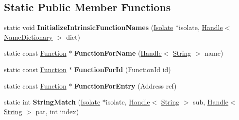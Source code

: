 \subsection*{Static Public Member Functions}
\begin{DoxyCompactItemize}
\item 
\hypertarget{classv8_1_1internal_1_1_runtime_a2af56c161b8cb654eaa8ef8f86e4ba5c}{}static void {\bfseries Initialize\+Intrinsic\+Function\+Names} (\hyperlink{classv8_1_1internal_1_1_isolate}{Isolate} $\ast$isolate, \hyperlink{classv8_1_1internal_1_1_handle}{Handle}$<$ \hyperlink{classv8_1_1internal_1_1_name_dictionary}{Name\+Dictionary} $>$ dict)\label{classv8_1_1internal_1_1_runtime_a2af56c161b8cb654eaa8ef8f86e4ba5c}

\item 
\hypertarget{classv8_1_1internal_1_1_runtime_aea6fd7c87dbfcbb2aa24d9b59214d557}{}static const \hyperlink{structv8_1_1internal_1_1_runtime_1_1_function}{Function} $\ast$ {\bfseries Function\+For\+Name} (\hyperlink{classv8_1_1internal_1_1_handle}{Handle}$<$ \hyperlink{classv8_1_1internal_1_1_string}{String} $>$ name)\label{classv8_1_1internal_1_1_runtime_aea6fd7c87dbfcbb2aa24d9b59214d557}

\item 
\hypertarget{classv8_1_1internal_1_1_runtime_a1fb4256645450f73e9ee39d4f38f3d58}{}static const \hyperlink{structv8_1_1internal_1_1_runtime_1_1_function}{Function} $\ast$ {\bfseries Function\+For\+Id} (Function\+Id id)\label{classv8_1_1internal_1_1_runtime_a1fb4256645450f73e9ee39d4f38f3d58}

\item 
\hypertarget{classv8_1_1internal_1_1_runtime_a82e21040bb88fd62e811b273d9592b62}{}static const \hyperlink{structv8_1_1internal_1_1_runtime_1_1_function}{Function} $\ast$ {\bfseries Function\+For\+Entry} (Address ref)\label{classv8_1_1internal_1_1_runtime_a82e21040bb88fd62e811b273d9592b62}

\item 
\hypertarget{classv8_1_1internal_1_1_runtime_a109f46396ee7cf24fa460908bff347a4}{}static int {\bfseries String\+Match} (\hyperlink{classv8_1_1internal_1_1_isolate}{Isolate} $\ast$isolate, \hyperlink{classv8_1_1internal_1_1_handle}{Handle}$<$ \hyperlink{classv8_1_1internal_1_1_string}{String} $>$ sub, \hyperlink{classv8_1_1internal_1_1_handle}{Handle}$<$ \hyperlink{classv8_1_1internal_1_1_string}{String} $>$ pat, int index)\label{classv8_1_1internal_1_1_runtime_a109f46396ee7cf24fa460908bff347a4}


\end{DoxyCompactItemize}
